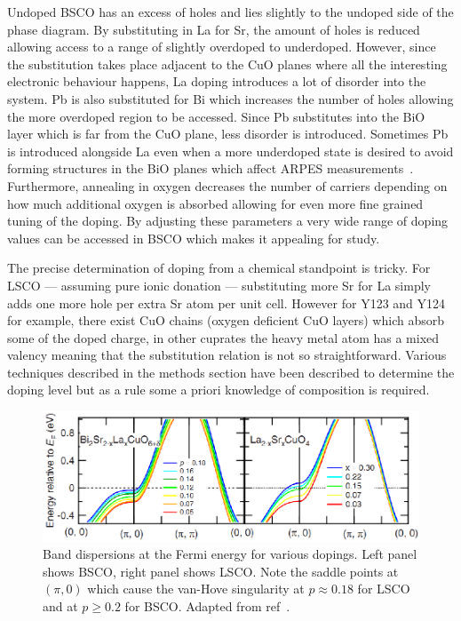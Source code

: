 Undoped \ac{BSCO} has an excess of holes and lies slightly to the undoped side of the phase diagram. By substituting in La for Sr, the amount of holes is reduced allowing access to a range of slightly overdoped to underdoped. However, since the substitution takes place adjacent to the CuO planes where all the interesting electronic behaviour happens, La doping introduces a lot of disorder into the system. Pb is also substituted for Bi which increases the number of holes allowing the more overdoped region to be accessed. Since Pb substitutes into the BiO layer which is far from the CuO plane, less disorder is introduced. Sometimes Pb is introduced alongside La even when a more underdoped state is desired to avoid forming structures in the BiO planes which affect \ac{ARPES} measurements~\cite{Kondo2007}. Furthermore, annealing in oxygen decreases the number of carriers depending on how much additional oxygen is absorbed allowing for even more fine grained tuning of the doping. By adjusting these parameters a very wide range of doping values can be accessed in \ac{BSCO} which makes it appealing for study.

The precise determination of doping from a chemical standpoint is tricky. For \ac{LSCO} --- assuming pure ionic donation --- substituting more Sr for La simply adds one more hole per extra Sr atom per unit cell. However for \ac{Y123} and \ac{Y124} for example, there exist CuO chains (oxygen deficient CuO layers) which absorb some of the doped charge, in other cuprates the heavy metal atom has a mixed valency meaning that the substitution relation is not so straightforward. Various techniques described in the methods section have been described to determine the doping level but as a rule some a priori knowledge of composition is required.
\begin{figure}[htbp]
    \begin{center}
        \includegraphics[scale=0.9]{Chapter-Introduction/Figures/VanHoveBSCOLSCO/VanHoveBSCOLSCO}
        \caption{Band dispersions at the Fermi energy for various dopings. Left panel shows \ac{BSCO}, right panel shows \ac{LSCO}. Note the saddle points at $(\pi, 0)$ which cause the van-Hove singularity at $p\approx 0.18$ for \ac{LSCO} and at $p \geq 0.2$ for \ac{BSCO}. Adapted from ref~\cite{Hashimoto2008}.}
        \label{Fig:Intro:VanHoveBSCOLSCO}
    \end{center}
\end{figure}

